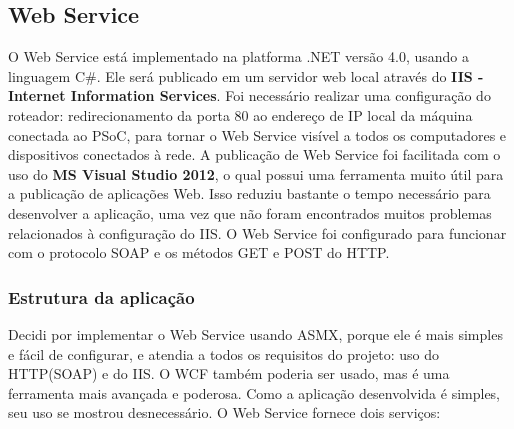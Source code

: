 \documentclass[a4paper,12pt,titlepage]{article}
\begin{document}
			 
	\subsection{Web Service}
		O Web Service está implementado na platforma .NET versão 4.0, usando a linguagem C\#. Ele será publicado em um servidor web local através do \textbf{IIS - Internet Information Services}. Foi necessário realizar uma configuração do roteador: redirecionamento da porta 80 ao endereço de IP local da máquina conectada ao PSoC, para tornar o Web Service visível a todos os computadores e dispositivos conectados à rede. 
		A publicação de Web Service foi facilitada com o uso do \textbf{MS Visual Studio 2012}, o qual possui uma ferramenta muito útil para a publicação de aplicações Web. Isso reduziu bastante o tempo necessário para desenvolver a aplicação, uma vez que não foram encontrados muitos problemas relacionados à configuração do IIS. O Web Service foi configurado para funcionar com o protocolo SOAP e os métodos  GET e POST do HTTP. 
		
		\subsubsection{Estrutura da aplicação}
			Decidi por implementar o Web Service usando ASMX, porque ele é mais simples e fácil de configurar, e atendia a todos os requisitos do projeto: uso do HTTP(SOAP) e do IIS. O WCF também poderia ser usado, mas é uma ferramenta mais avançada e poderosa. Como a aplicação desenvolvida é simples, seu uso se mostrou desnecessário.   
			O Web Service fornece dois serviços:
\end{document}
